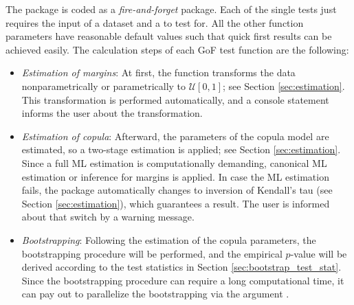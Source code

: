 The package is coded as a \textit{fire-and-forget} package. Each of the single tests just requires the input of a dataset  and a  to test for. All the other function parameters have reasonable default values such that quick first results can be achieved easily. The calculation steps of each GoF test function are the following:
\begin{itemize}
    \item \textit{Estimation of margins}: At first, the function transforms the data nonparametrically or parametrically to $\mathcal{U}[0,1]$; see Section \ref{sec:estimation}. This transformation is performed automatically, and a console statement informs the user about the transformation.
    \item \textit{Estimation of copula}: Afterward, the parameters of the copula model are estimated, so a two-stage estimation is applied; see Section \ref{sec:estimation}. Since a full ML estimation is computationally demanding, canonical ML estimation or inference for margins is applied. In case the ML estimation fails, the package automatically changes to inversion of Kendall's tau (see Section \ref{sec:estimation}), which guarantees a result. The user is informed about that switch by a warning message. 
    \item \textit{Bootstrapping}: Following the estimation of the copula parameters, the bootstrapping procedure will be performed, and the empirical $p$-value will be derived according to the test statistics in Section \ref{sec:bootstrap_test_stat}. Since the bootstrapping procedure can require a long computational time, it can pay out to parallelize the bootstrapping via the argument . 
\end{itemize}

